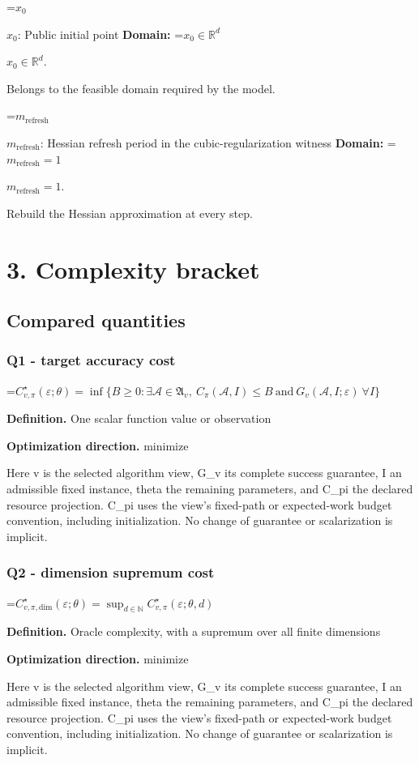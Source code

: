 \documentclass[10pt,a4paper]{article}
\newcommand{\AtlasMath}[1]{\par\begingroup\centering\setbox0=\hbox{$\displaystyle #1$}\ifdim\wd0>1.4\linewidth\typeout{ATLAS WIDE FORMULA: \the\wd0}\fi\ifdim\wd0>\linewidth\resizebox{\linewidth}{!}{\box0}\else\box0\fi\par\endgroup}
\newcommand{\AtlasInlineMath}[1]{\begingroup\setbox0=\hbox{$#1$}\ifdim\wd0>.4\linewidth\endgroup\AtlasMath{#1}\else\endgroup$#1$\fi}
\begin{document}
\AtlasInlineMath{x_0}: Public initial point \textbf{Domain:} \AtlasInlineMath{x_0\in\mathbb{R}^d}.

Belongs to the feasible domain required by the model.

\AtlasInlineMath{m_{\mathrm{refresh}}}: Hessian refresh period in the cubic-regularization witness \textbf{Domain:} \AtlasInlineMath{m_{\mathrm{refresh}}=1}.

Rebuild the Hessian approximation at every step.

\section{3. Complexity bracket}
\subsection{Compared quantities}
\subsubsection{Q1 - target accuracy cost}
\AtlasMath{C^\star_{v,\pi}(\varepsilon;\theta)=\inf\{B\ge0:\exists\mathcal A\in\mathfrak A_v,\ C_\pi(\mathcal A,I)\le B\ \text{and}\ G_v(\mathcal A,I;\varepsilon)\ \forall I\}}
\textbf{Definition.} One scalar function value or observation

\textbf{Optimization direction.} minimize

Here v is the selected algorithm view, G\_v its complete success guarantee, I an admissible fixed instance, theta the remaining parameters, and C\_pi the declared resource projection. C\_pi uses the view's fixed-path or expected-work budget convention, including initialization. No change of guarantee or scalarization is implicit.

\subsubsection{Q2 - dimension supremum cost}
\AtlasMath{C^\star_{v,\pi,\mathrm{dim}}(\varepsilon;\theta)=\sup_{d\in\mathbb N}C^\star_{v,\pi}(\varepsilon;\theta,d)}
\textbf{Definition.} Oracle complexity, with a supremum over all finite dimensions

\textbf{Optimization direction.} minimize

Here v is the selected algorithm view, G\_v its complete success guarantee, I an admissible fixed instance, theta the remaining parameters, and C\_pi the declared resource projection. C\_pi uses the view's fixed-path or expected-work budget convention, including initialization. No change of guarantee or scalarization is implicit.
\end{document}
